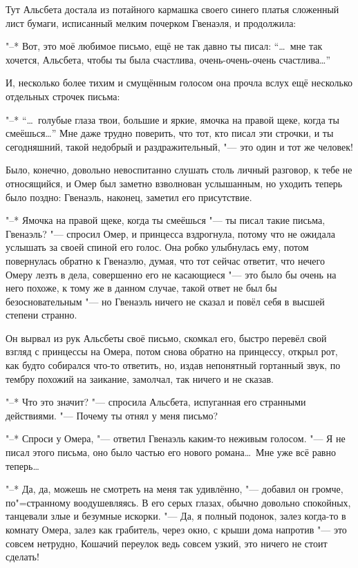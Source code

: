 Тут Альсбета достала из потайного кармашка своего синего платья сложенный лист
бумаги, исписанный мелким почерком Гвенаэля, и продолжила:

"--* Вот, это моё любимое письмо, ещё не так давно ты писал:
\enquote{\ldots\ мне так хочется, Альсбета, чтобы ты была счастлива, очень-очень-очень
счастлива\ldots}

И, несколько более тихим и смущённым голосом она прочла вслух ещё несколько
отдельных строчек письма:

"--* \enquote{\ldots\ голубые глаза твои, большие и яркие, ямочка на правой щеке,
когда ты смеёшься\ldots}
Мне даже трудно поверить, что тот, кто писал эти строчки, и ты сегодняшний,
такой недобрый и раздражительный, "--- это один и тот же человек!

Было, конечно, довольно невоспитанно слушать столь личный разговор, к тебе не
относящийся, и Омер был заметно взволнован услышанным, но уходить теперь было
поздно: Гвенаэль, наконец, заметил его присутствие.

"--* Ямочка на правой щеке, когда ты смеёшься "--- ты писал такие письма,
Гвенаэль? "--- спросил Омер, и принцесса вздрогнула, потому что не ожидала
услышать за своей спиной его голос.
Она робко улыбнулась ему, потом повернулась обратно к Гвенаэлю, думая, что тот
сейчас ответит, что нечего Омеру лезть в дела, совершенно его не касающиеся "---
это было бы очень на него похоже, к тому же в данном случае, такой ответ не был
бы безосновательным "--- но Гвенаэль ничего не сказал и повёл себя в высшей
степени странно.

Он вырвал из рук Альсбеты своё письмо, скомкал его, быстро перевёл свой взгляд с
принцессы на Омера, потом снова обратно на принцессу, открыл рот, как будто
собирался что-то ответить, но, издав непонятный гортанный звук, по тембру
похожий на заикание, замолчал, так ничего и не сказав.

"--* Что это значит? "--- спросила Альсбета, испуганная его странными
действиями.
"--- Почему ты отнял у меня письмо?

"--* Спроси у Омера, "--- ответил Гвенаэль каким-то неживым голосом.
"--- Я не писал этого письма, оно было частью его нового романа\ldots\
Мне уже всё равно теперь\ldots

"--* Да, да, можешь не смотреть на меня так удивлённо, "--- добавил он громче,
по"=странному воодушевляясь.
В его серых глазах, обычно довольно спокойных, танцевали злые и безумные
искорки.
"--- Да, я полный подонок, залез когда-то в комнату Омера, залез как грабитель,
через окно, с крыши дома напротив "--- это совсем нетрудно, Кошачий переулок
ведь совсем узкий, это ничего не стоит сделать!

